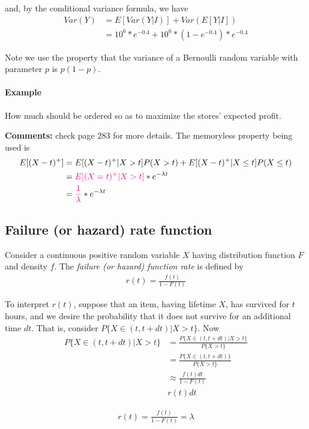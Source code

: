 \documentclass[10 pt,final]{article}
\newcommand{\impo}[1]{{\color{magenta} #1}}
\begin{document}
and, by the \impo{conditional variance formula}, we have
\begin{align*}
Var(Y) & = E[Var(Y|I)] + Var(E[Y|I]) \\
& = 10^6 * e^{-0.4} + 10^6 *(1-e^{-0.4})*e^{-0.4}
\end{align*}

Note we use the property that the variance of a Bernoulli random variable with parameter $p$ is $p(1-p)$.

\paragraph{Example} How much should be ordered so as to maximize the stores' expected profit.

\textbf{Comments:} check page $283$ for more details. The memoryless property being used is 
\begin{align*}
E[(X-t)^+] & = E[(X-t)^+ | X>t] P(X > t) + E[(X-t)^+ | X \leq t] P(X \leq t) \\
& = \impo{E[(X=t)^+ | X>t]} * e^{-\lambda t} \\
& = \impo{\frac{1}{\lambda}} * e^{-\lambda t} 
\end{align*}

\subsection{Failure (or hazard) rate function} Consider a continuous positive random variable $X$ having distribution function $F$ and density $f$. The \emph{failure (or hazard) function rate} is defined by
\begin{align*}
r(t) = \frac{f(t)}{1-F(t)}
\end{align*}

To interpret $r(t)$, suppose that an item, having lifetime $X$, has survived for $t$ hours, and we desire the probability that it does not survive for an additional time $dt$. That is, consider $P\{X \in (t, t+dt) | X>t\}$. Now
\begin{align*}
P\{X \in (t, t+dt)| X>t\} & = \frac{P\{X \in (t, t+dt) | X>t\}}{P\{X>t\}} \\
& = \frac{P\{X \in (t, t+dt)\}}{P\{X>t\}} \\
& \approx \frac{f(t)dt}{1-F(t)} \\
& r(t)dt
\end{align*}

\begin{align*}
r(t) = \frac{f(t)}{1-F(t)} = \lambda
\end{align*}
\end{document}
